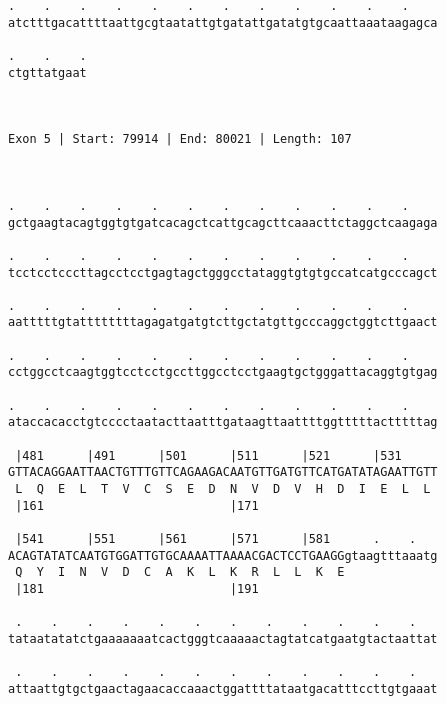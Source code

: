 \documentclass{article}
\begin{document}
\begin{Verbatim}
.    .    .    .    .    .    .    .    .    .    .    .    
atctttgacattttaattgcgtaatattgtgatattgatatgtgcaattaaataagagca
                                                            
.    .    .
ctgttatgaat
           
           
 
Exon 5 | Start: 79914 | End: 80021 | Length: 107



.    .    .    .    .    .    .    .    .    .    .    .    
gctgaagtacagtggtgtgatcacagctcattgcagcttcaaacttctaggctcaagaga
                                                            
.    .    .    .    .    .    .    .    .    .    .    .    
tcctcctcccttagcctcctgagtagctgggcctataggtgtgtgccatcatgcccagct
                                                            
.    .    .    .    .    .    .    .    .    .    .    .    
aatttttgtattttttttagagatgatgtcttgctatgttgcccaggctggtcttgaact
                                                            
.    .    .    .    .    .    .    .    .    .    .    .    
cctggcctcaagtggtcctcctgccttggcctcctgaagtgctgggattacaggtgtgag
                                                            
.    .    .    .    .    .    .    .    .    .    .    .    
ataccacacctgtcccctaatacttaatttgataagttaattttggtttttactttttag
                                                            
 |481      |491      |501      |511      |521      |531     
GTTACAGGAATTAACTGTTTGTTCAGAAGACAATGTTGATGTTCATGATATAGAATTGTT
 L  Q  E  L  T  V  C  S  E  D  N  V  D  V  H  D  I  E  L  L 
 |161                          |171                         
  
 |541      |551      |561      |571      |581      .    .   
ACAGTATATCAATGTGGATTGTGCAAAATTAAAACGACTCCTGAAGGgtaagtttaaatg
 Q  Y  I  N  V  D  C  A  K  L  K  R  L  L  K  E             
 |181                          |191                         
  
 .    .    .    .    .    .    .    .    .    .    .    .   
tataatatatctgaaaaaaatcactgggtcaaaaactagtatcatgaatgtactaattat
                                                            
 .    .    .    .    .    .    .    .    .    .    .    .   
attaattgtgctgaactagaacaccaaactggattttataatgacatttccttgtgaaat
                                                            

\end{Verbatim}
\end{document}
